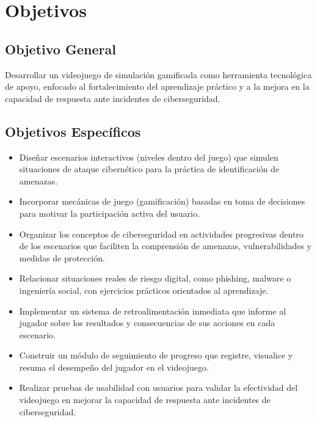 \section{Objetivos}

\subsection{Objetivo General}

Desarrollar un videojuego de simulación gamificada como herramienta tecnológica de apoyo, enfocado al fortalecimiento del aprendizaje
práctico y a la mejora en la capacidad de respuesta ante incidentes de ciberseguridad.

\subsection{Objetivos Específicos}

\begin{itemize}
    \item Diseñar escenarios interactivos (niveles dentro del juego) que simulen situaciones de ataque cibernético para la práctica de identificación de amenazas.
    \item Incorporar mecánicas de juego (gamificación) basadas en toma de decisiones para motivar la participación activa del usuario.
    \item Organizar los conceptos de ciberseguridad en actividades progresivas dentro de los escenarios que faciliten la comprensión de amenazas, vulnerabilidades y medidas de protección.
    \item Relacionar situaciones reales de riesgo digital, como phishing, malware o ingeniería social, con ejercicios prácticos orientados al aprendizaje.
    \item Implementar un sistema de retroalimentación inmediata que informe al jugador sobre los resultados y consecuencias de sus acciones en cada escenario.
    \item Construir un módulo de seguimiento de progreso que registre, visualice y resuma el desempeño del jugador en el videojuego.
    \item Realizar pruebas de usabilidad con usuarios para validar la efectividad del videojuego en mejorar la capacidad de respuesta ante incidentes de ciberseguridad.
\end{itemize}
